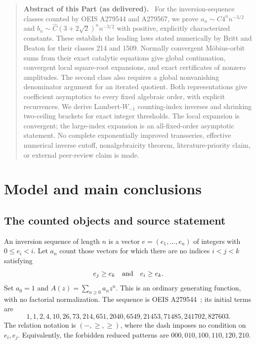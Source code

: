 \documentclass[11pt,letterpaper]{article}
\theoremstyle{remark}\newtheorem{remark}[theorem]{Remark}
\newenvironment{partabstract}{\begin{quote}\small\noindent\textbf{Abstract of this Part (as delivered).}\ }{\end{quote}}
\begin{document}
\begin{partabstract}
For the inversion-sequence classes counted by OEIS A279544 and A279567,
we prove $a_n\sim C4^n n^{-3/2}$ and
$b_n\sim\widehat C(3+2\sqrt2)^n n^{-3/2}$ with positive,
explicitly characterized constants. These establish the leading laws
stated numerically by Britt and Beaton for their classes 214 and 1509.
Normally convergent M\"obius-orbit sums from their exact catalytic
equations give global continuation, convergent local square-root
expansions, and exact certificates of nonzero amplitudes. The second
class also requires a global nonvanishing denominator argument for
an iterated quotient. Both representations give coefficient asymptotics
to every fixed algebraic order, with explicit recurrences. We derive
Lambert-$W_{-1}$ counting-index inverses and shrinking two-ceiling
brackets for exact integer thresholds. The local expansion is convergent; the large-index
expansion is an all-fixed-order asymptotic statement. No complete
exponentially improved transseries, effective numerical inverse cutoff,
nonalgebraicity theorem, literature-priority claim, or external peer-review
claim is made.
\end{partabstract}

\section{Model and main conclusions}
\subsection{The counted objects and source statement}
An inversion sequence of length $n$ is a vector $e=(e_1,\ldots,e_n)$
of integers with $0\le e_i<i$. Let $a_n$ count those vectors for which
there are no indices $i<j<k$ satisfying
\begin{equation}\label{ivk:orb:avoid214}
e_j\ge e_k\quad\hbox{and}\quad e_i\ge e_k.
\end{equation}
Set $a_0=1$ and $A(z)=\sum_{n\ge0}a_nz^n$. This is an ordinary generating
function, with no factorial normalization. The sequence is
OEIS A279544~\cite{oeis214}; its initial terms are
\[
1,1,2,4,10,26,73,214,651,2040,6549,21453,71485,241702,827603.
\]
The relation notation is $(-,\ge,\ge)$, where the dash imposes no
condition on $e_i,e_j$. Equivalently, the forbidden reduced patterns
are $000,010,100,110,120,210$.
\end{document}
